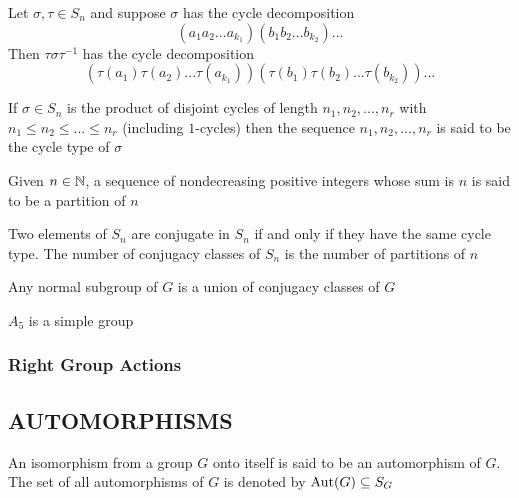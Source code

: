 \begin{proposition}
	Let $\sigma, \tau \in S_n$ and suppose $\sigma$ has the cycle decomposition
	\[
	(a_1 a_2 ... a_{k_1}) (b_1 b_2 ... b_{k_2}) ...
	\]
	Then $\tau \sigma \tau^{-1}$ has the cycle decomposition
	\[
	(\tau(a_1) \tau(a_2) ... \tau(a_{k_1})) (\tau(b_1) \tau(b_2) ... \tau(b_{k_2})) ...
	\]
\end{proposition}

\begin{definition}
	If $\sigma \in S_n$ is the product of disjoint cycles of length $n_1, n_2, ..., n_r$ with $n_1 \leq n_2 \leq ... \leq n_r$ (including $1$-cycles) then the sequence $n_1, n_2, ..., n_r$ is said to be the cycle type of $\sigma$
\end{definition}

\begin{definition}
	Given $n \in \mathbb{N}$, a sequence of nondecreasing positive integers whose sum is $n$ is said to be a partition of $n$
\end{definition}

\begin{proposition}
	Two elements of $S_n$ are conjugate in $S_n$ if and only if they have the same cycle type. The number of conjugacy classes of $S_n$ is the number of partitions of $n$
\end{proposition}

\begin{proposition}
	Any normal subgroup of $G$ is a union of conjugacy classes of $G$
\end{proposition}

\begin{theorem}
	$A_5$ is a simple group
\end{theorem}

\subsubsection{Right Group Actions}

\subsection{AUTOMORPHISMS}

\begin{definition}[Automorphism]
	An isomorphism from a group $G$ onto itself is said to be an automorphism of $G$. The set of all automorphisms of $G$ is denoted by $\operatorname{Aut}(G) \subseteq S_G$
\end{definition}

